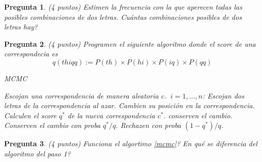\documentclass{article}
\newtheorem{pregunta}{Pregunta}
\begin{document}
\begin{pregunta} (4 puntos)
  Estimen la frecuencia con la que aperecen todas las posibles combinaciones de dos letras. Cu\'antas combinaciones posibles de dos letras hay?
\end{pregunta}

\begin{pregunta} (4 puntos)
  Programen el siguiente algoritmo donde el score de una correspondecia es
  \begin{equation}
    q(thiqq) := P(th) \times P(hi) \times P(iq) \times P(qq)
  \end{equation}

\begin{algorithm}
\caption{MCMC}\label{mcmc}
\begin{algorithmic}[1]
\State Escojan una correspondencia de manera aleatoria $c$.
\For $ ~ i = 1, ..., n$:
\State Escojan dos letras de la correspondencia al azar.
\State Cambien su posici\'on en la correspondencia.
\State Calculen el score $q^*$ de la nueva correspondencia $c^*$.
 conserven el cambio.
\EndIf
{}
\State Conserven el cambio con proba $q^*/q$.
\State Rechazen con proba $(1-q^*)/q$.
\EndIf
\EndFor
\EndProcedure
\end{algorithmic}
\end{algorithm}

\end{pregunta}

\begin{pregunta} (4 puntos)
Funciona el algortimo \ref{mcmc}? En qu\'e se diferencia del algoritmo del paso 1?
\end{pregunta}
\end{document}
